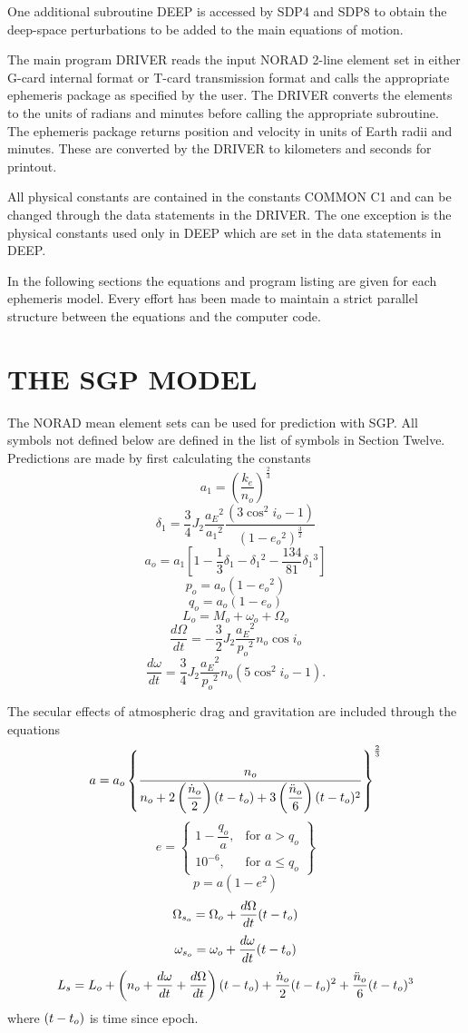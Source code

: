 One additional subroutine DEEP is accessed by SDP4 and SDP8 to obtain the
deep-space perturbations to be added to the main equations of motion.

The main program DRIVER reads the input NORAD 2-line element set in either
G-card internal format or T-card transmission format and calls the appropriate
ephemeris package as specified by the user.  The DRIVER converts the elements
to the units of radians and minutes before calling the appropriate subroutine.
The ephemeris package returns position and velocity in units of Earth radii
and minutes.  These are converted by the DRIVER to kilometers and seconds for
printout.

All physical constants are contained in the constants COMMON C1 and can be
changed through the data statements in the DRIVER.  The one exception is the
physical constants used only in DEEP which are set in the data statements in
DEEP.

In the following sections the equations and program listing are given for each
ephemeris model.  Every effort has been made to maintain a strict parallel
structure between the equations and the computer code.

\section[The SGP Model]{THE SGP MODEL}
The NORAD mean element sets can be used for prediction with SGP.  All symbols
not defined below are defined in the list of symbols in Section Twelve.
Predictions are made by first calculating the constants
\[a_1=\left(\dfrac{k_e}{n_o}\right)^{\frac23}\]
\[\delta_1=\dfrac34J_2\dfrac{a_E{}^2}{a_1{}^2}\dfrac{(3\cos^2i_o-1)}
{(1-e_o{}^2)^{\frac32}}\]
\[a_o=a_1\left[1-\dfrac13\delta_1-\delta_1{}^2
-\dfrac{134}{81}\delta_1{}^3\right]\]
\[p_o=a_o(1-e_o{}^2)\]
\[q_o=a_o(1-e_o)\]
\[L_o=M_o+\omega_o+\Omega_o\]
\[\dfrac{d\Omega}{dt}=-\dfrac32J_2\dfrac{a_E{}^2}{p_o{}^2}n_o\cos i_o\]
\[\dfrac{d\omega}{dt}=\dfrac34J_2\dfrac{a_E{}^2}{p_o{}^2}n_o(5\cos^2i_o-1).\]

The secular effects of atmospheric drag and gravitation are included through
the equations
\[a=a_o\left\{{\displaystyle{n_o\over n_o+2\left({\displaystyle{\dot{n}_o\over2}}\right)
(t-t_o)+3\left({\displaystyle{\ddot{n}_o\over6}}\right)(t-t_o)^2}}\right\}^{\frac23}\]
\[e=\left\{\begin{array}{ll}
              1-\dfrac{q_o}a, & \mbox{for } a > q_o\\[12pt]
              10^{-6}, & \mbox{for } a \leq q_o
              \end{array}\right\}\]
\[p=a(1-e^2)\]
\[\Omega_{s_o}=\Omega_o+{\displaystyle{d\Omega\over dt}}(t-t_o)\]
\[\omega_{s_o}=\omega_o+{\displaystyle{d\omega\over dt}}(t-t_o)\]
\[L_s=L_o+\left(n_o+{\displaystyle{d\omega\over dt}}+{\displaystyle{d\Omega\over dt}}\right)
(t-t_o)+{\displaystyle{\dot{n}_o\over2}}(t-t_o)^2+{\displaystyle{\ddot{n}_o\over6}}(t-t_o)^3\]
where $(t-t_o)$ is time since epoch.

